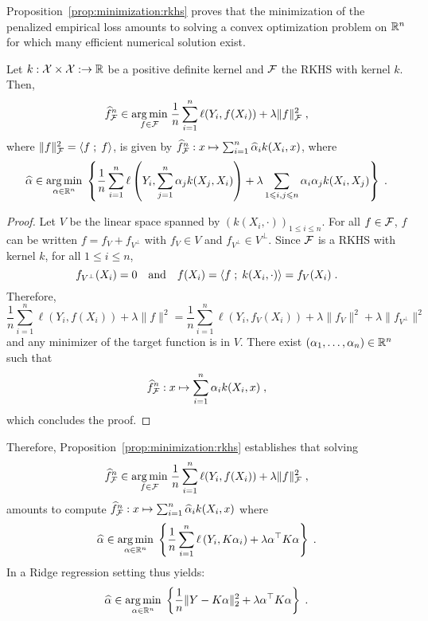 Proposition~\ref{prop:minimization:rkhs} proves that the minimization of the penalized empirical loss amounts to solving a convex optimization problem on $\mathbb{R}^n$ for which many efficient  numerical solution exist.
\begin{shaded}
\begin{proposition}
\label{prop:minimization:rkhs}
Let $k:\mathcal{X}\times\mathcal{X}:\to \mathbb{R}$ be a positive definite kernel and $\mathcal{F}$ the RKHS with kernel $k$. Then, 
\[
\widehat f^n_{\calF} \in \underset{f\in\calF}{\argmin}\;\frac{1}{n}\sum_{i=1}^n \ell(Y_i,f(X_i)) + \lambda\|f\|_\calF^2\eqsp,
\]
where $\|f\|^2_{\mathcal{F}} = \langle f\;;\; f\rangle$, is given by $\widehat f^n_{\mathcal{F}} : x \mapsto \sum_{i=1}^n \widehat \alpha_i k(X_i,x)$, where
\[
\widehat\alpha \in \underset{\alpha \in \rset^n}{\argmin}\;\left\{\frac{1}{n}\sum_{i=1}^n \ell\left(Y_i,\sum_{j=1}^n\alpha_jk(X_j,X_i)\right) + \lambda \sum_{1\leqslant i,j \leqslant n}\alpha_i \alpha_j k(X_i,X_j)\right\}\eqsp.
\]
\end{proposition}
\end{shaded}
\begin{proof}
Let $V$ be the linear space spanned by $(k(X_i,\cdot))_{1\leqslant i\leqslant n}$. For all $f\in\mathcal{F}$, $f$ can be written $f = f_V + f_{V^\perp}$ with $f_V\in V$ and $f_{V^\perp}\in V^\perp$. Since $\mathcal{F}$ is a RKHS with kernel $k$, for all $1\leqslant i \leqslant n$,
\[
f_{V^\perp}(X_i) = 0\quad \mathrm{and} \quad f(X_i) = \langle f\;;\; k(X_i,\cdot)\rangle = f_V(X_i)\;.
\]
Therefore,
\[
\frac{1}{n}\sum_{i=1}^n \ell(Y_i,f(X_i)) + \lambda\|f\|^2 = \frac{1}{n}\sum_{i=1}^n \ell(Y_i,f_V(X_i)) + \lambda\|f_V\|^2 + \lambda\|f_{V^\perp}\|^2
\]
and any minimizer of the target function is in $V$. There exist $(\alpha_1,\ldots,\alpha_n)\in \mathbb{R}^n$ such that 
\[
\widehat f^n_{\mathcal{F}} :x\mapsto \sum_{i=1}^n \alpha_i k(X_i,x)\;,
\]
which concludes the proof.
\end{proof}
Therefore, Proposition~\ref{prop:minimization:rkhs} establishes that  solving 
\[
\widehat f^n_{\calF} \in \underset{f\in\calF}{\argmin}\;\frac{1}{n}\sum_{i=1}^n \ell(Y_i,f(X_i)) + \lambda\|f\|_\calF^2\eqsp,
\]
amounts to compute  $\widehat f^n_{\mathcal{F}} : x \mapsto \sum_{i=1}^n \widehat \alpha_i k(X_i,x)$ where
\[
\widehat\alpha \in \underset{\alpha \in \rset^n}{\argmin}\;\left\{\frac{1}{n}\sum_{i=1}^n \ell\left(Y_i,K\alpha_i\right) + \lambda \alpha^\top K \alpha\right\}\eqsp.
\]
In a Ridge regression setting thus yields:
\[
\widehat\alpha \in \underset{\alpha \in \rset^n}{\argmin}\;\left\{\frac{1}{n} \|Y-K\alpha\|_2^2+ \lambda \alpha^\top K \alpha\right\}\eqsp.
\]